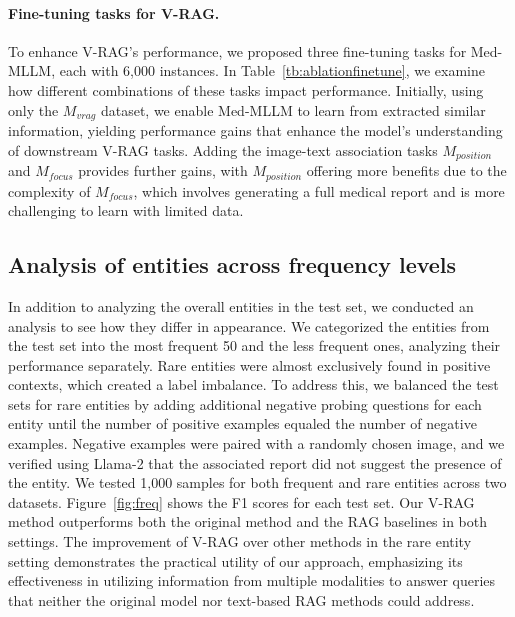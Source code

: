 \paragraph{Fine-tuning tasks for V-RAG.}
To enhance V-RAG's performance, we proposed three fine-tuning tasks for Med-MLLM, each with 6,000 instances. In Table~\ref{tb:ablationfinetune}, we examine how different combinations of these tasks impact performance.
Initially, using only the $M_{vrag}$ dataset, we enable Med-MLLM to learn from extracted similar information, yielding performance gains that enhance the model's understanding of downstream V-RAG tasks.
Adding the image-text association tasks $M_{position}$ and $M_{focus}$ provides further gains, with $M_{position}$ offering more benefits due to the complexity of $M_{focus}$, which involves generating a full medical report and is more challenging to learn with limited data.




\subsection{Analysis of entities across frequency levels}
In addition to analyzing the overall entities in the test set, we conducted an analysis to see how they differ in appearance. We categorized the entities from the test set into the most frequent 50 and the less frequent ones, analyzing their performance separately. Rare entities were almost exclusively found in positive contexts, which created a label imbalance. To address this, we balanced the test sets for rare entities by adding additional negative probing questions for each entity until the number of positive examples equaled the number of negative examples. Negative examples were paired with a randomly chosen image, and we verified using Llama-2 that the associated report did not suggest the presence of the entity. We tested 1,000 samples for both frequent and rare entities across two datasets.
Figure~\ref{fig:freq} shows the F1 scores for each test set. Our V-RAG method outperforms both the original method and the RAG baselines in both settings. The improvement of V-RAG over other methods in the rare entity setting demonstrates the practical utility of our approach, emphasizing its effectiveness in utilizing information from multiple modalities to answer queries that neither the original model nor text-based RAG methods could address.


